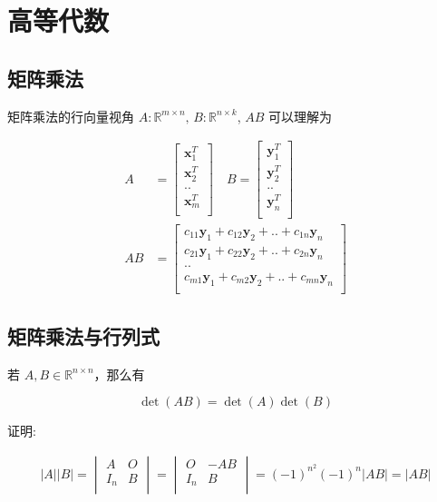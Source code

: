 \documentclass[12pt,a4paper]{ctexart}
\begin{document}
\section{高等代数}

\subsection{矩阵乘法}

矩阵乘法的行向量视角 $A: \mathbb{R}^{m \times n},\, B: \mathbb{R}^{n \times k}$, $AB$ 可以理解为

\begin{align*}
    A &= \begin{bmatrix}
        \mathbf{x}_1^T \\
        \mathbf{x}_2^T \\
        .. \\
        \mathbf{x}_m^T \\
    \end{bmatrix}\quad
    B = \begin{bmatrix}
        \mathbf{y}_1^T \\
        \mathbf{y}_2^T \\
        .. \\
        \mathbf{y}_n^T \\
    \end{bmatrix} \\
    AB &= \begin{bmatrix}
        c_{11}\mathbf{y}_1 + c_{12}\mathbf{y}_2 + .. +  c_{1n}\mathbf{y}_n \\
        c_{21}\mathbf{y}_1 + c_{22}\mathbf{y}_2 + .. +  c_{2n}\mathbf{y}_n \\
         .. \\
        c_{m1}\mathbf{y}_1 + c_{m2}\mathbf{y}_2 + .. +  c_{mn}\mathbf{y}_n \\
    \end{bmatrix}
\end{align*}

\subsection{矩阵乘法与行列式}

若 $A,B \in \mathbb{R}^{n \times n}$，那么有

\[
\det(AB) = \det(A) \det(B)
\]

证明:

\begin{align*}
    |A||B| = \begin{vmatrix}
        A & O \\
        I_n & B \\
    \end{vmatrix} =     \begin{vmatrix}
        O & -AB \\
        I_n & B \\
    \end{vmatrix}  =  (-1)^{n^2} (-1)^n|AB| = |AB|
\end{align*}
\end{document}
